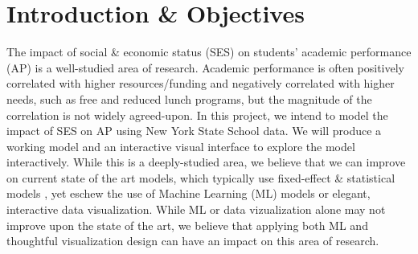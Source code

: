 \documentclass[sigconf,nonacm,11pt]{acmart}
\begin{document}
\section{Introduction \& Objectives}

The impact of  social \& economic status (SES) on students' academic performance (AP) is a well-studied area of research.  Academic performance is often positively correlated with higher resources/funding \cite{?}and negatively correlated with higher needs, such as free and reduced lunch programs\cite{sirin}, but the magnitude of the correlation is not widely agreed-upon. In this project, we intend to model the impact of SES on AP using New York State School data. We will produce a working model and an interactive visual interface to explore the model interactively. While this is a deeply-studied area, we believe that we can improve on current state of the art models, which typically use fixed-effect \& statistical models \cite{hearn, farooq, winters, jinnai}, yet eschew the use of Machine Learning (ML) models or elegant, interactive data visualization. While ML or data vizualization alone may not improve upon the state of the art, we believe that applying both ML and thoughtful visualization design can have an impact on this area of research.


\end{document}
